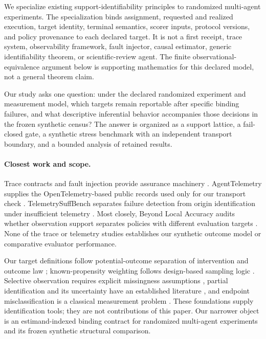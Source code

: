 \documentclass{article}
\begin{document}
We specialize existing support-identifiability principles to randomized multi-agent experiments. The specialization binds assignment, requested and realized execution, target identity, terminal semantics, scorer inputs, protocol versions, and policy provenance to each declared target. It is not a first receipt, trace system, observability framework, fault injector, causal estimator, generic identifiability theorem, or scientific-review agent. The finite observational-equivalence argument below is supporting mathematics for this declared model, not a general theorem claim.

Our study asks one question: under the declared randomized experiment and measurement model, which targets remain reportable after specific binding failures, and what descriptive inferential behavior accompanies those decisions in the frozen synthetic census? The answer is organized as a support lattice, a fail-closed gate, a synthetic stress benchmark with an independent transport boundary, and a bounded analysis of retained results.

\paragraph{Closest work and scope.}
Trace contracts and fault injection provide assurance machinery \citep{traceassurance2026}. AgentTelemetry supplies the OpenTelemetry-based public records used only for our transport check \citep{agenttelemetry2026}. TelemetrySuffBench separates failure detection from origin identification under insufficient telemetry \citep{telemetrysuffbench2026}. Most closely, Beyond Local Accuracy audits whether observation support separates policies with different evaluation targets \citep{beyondlocalaccuracy2026}. None of the trace or telemetry studies establishes our synthetic outcome model or comparative evaluator performance.

Our target definitions follow potential-outcome separation of intervention and outcome law \citep{rubin1974}; known-propensity weighting follows design-based sampling logic \citep{horvitzthompson1952}. Selective observation requires explicit missingness assumptions \citep{robinsrotnitzkyzhao1994}, partial identification and its uncertainty have an established literature \citep{manski1990,imbensmanski2004}, and endpoint misclassification is a classical measurement problem \citep{bross1954}. These foundations supply identification tools; they are not contributions of this paper. Our narrower object is an estimand-indexed binding contract for randomized multi-agent experiments and its frozen synthetic structural comparison.
\end{document}

